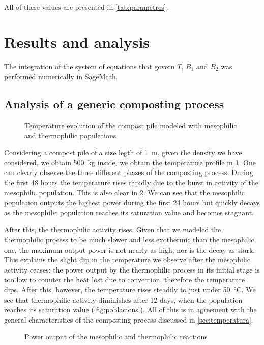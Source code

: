 \documentclass[12pt, a4paper, twocolumn, twoside]{article}
\numberwithin{table}{section}
\numberwithin{figure}{section}
\numberwithin{equation}{section}
\begin{document}
All of these values are presented in \cref{tab:parametres}.

\section{Results and analysis}
The integration of the system of equations that govern \( T \), \( B_1 \) and \( B_2 \) was performed numerically in SageMath. 

\subsection{Analysis of a generic composting process}

\begin{figure}[htb]
	\sffamily \footnotesize \centering
	
	\caption{Temperature evolution of the compost pile modeled with mesophilic and thermophilic populations}
	\label{fig:temp-mesos-termos}
\end{figure}

Considering a compost pile of a size legth of \SI{1}{m}, given the density we have considered, we obtain \SI{500}{kg} inside, we obtain the temperature profile in \cref{fig:temp-mesos-termos}. One can clearly observe the three different phases of the composting process. During the first 48 hours the temperature rises rapidly due to the burst in activity of the mesophilic population. This is also clear in \cref{fig:potencies}. We can see that the mesophilic population outputs the highest power during the first 24 hours but quickly decays as the mesophilic population reaches its saturation value and becomes stagnant.

After this, the thermophilic activity rises. Given that we modeled the thermophilic process to be much slower and less exothermic than the mesophilic one, the maximum output power is not nearly as high, nor is the decay as stark. This explains the slight dip in the temperature we observe after the mesophilic activity ceases: the power output by the thermophilic process in its initial stage is too low to counter the heat lost due to convection, therefore the temperature dips. After this, however, the temperature rises steadily to just under \SI{50}{\celsius}. We see that thermophilic activity diminishes after 12 days, when the population reaches its saturation value (\cref{fig:poblacions}). All of this is in agreement with the general characteristics of the composting process discussed in \cref{sec:temperatura}.

\begin{figure}[htb]
	\sffamily \footnotesize \centering
	
	\caption{Power output of the mesophilic and thermophilic reactions}
	\label{fig:potencies}
\end{figure}
\end{document}
